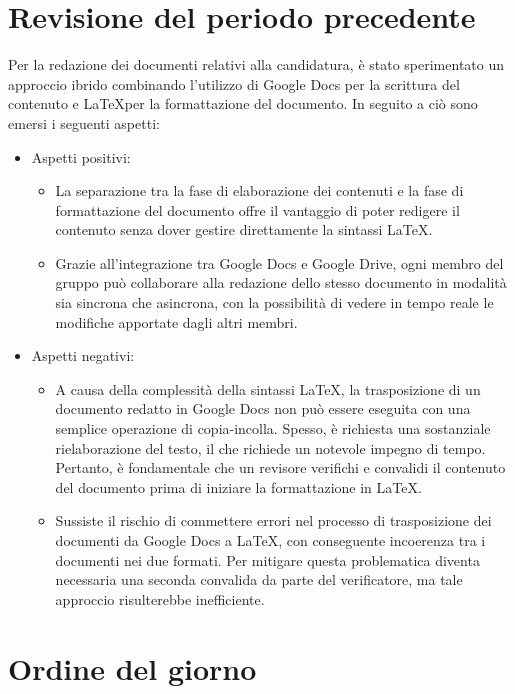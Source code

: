 \documentclass{article}
\begin{document}
\section{Revisione del periodo precedente}
Per la redazione dei documenti relativi alla candidatura, è stato sperimentato un approccio ibrido combinando l'utilizzo di Google Docs per la scrittura del contenuto e \LaTeX per la formattazione del documento. In seguito a ciò sono emersi i seguenti aspetti:
\begin{itemize}
    \item Aspetti positivi:
        \begin{itemize}
            \item La separazione tra la fase di elaborazione dei contenuti e la fase di formattazione del documento offre il vantaggio di poter redigere il contenuto senza dover gestire direttamente la sintassi \LaTeX.
            \item Grazie all’integrazione tra Google Docs e Google Drive, ogni membro del gruppo può collaborare alla redazione dello stesso documento in modalità sia sincrona che asincrona, con la possibilità di vedere in tempo reale le modifiche apportate dagli altri membri.
        \end{itemize}
    \item Aspetti negativi:
        \begin{itemize}
            \item A causa della complessità della sintassi \LaTeX, la trasposizione di un documento redatto in Google Docs non può essere eseguita con una semplice operazione di copia-incolla. Spesso, è richiesta una sostanziale rielaborazione del testo, il che richiede un notevole impegno di tempo. Pertanto, è fondamentale che un revisore verifichi e convalidi il contenuto del documento prima di iniziare la formattazione in \LaTeX.
            \item Sussiste il rischio di commettere errori nel processo di trasposizione dei documenti da Google Docs a \LaTeX, con conseguente incoerenza tra i documenti nei due formati. Per mitigare questa problematica diventa necessaria una seconda convalida da parte del verificatore, ma tale approccio risulterebbe inefficiente.
        \end{itemize}
\end{itemize}

\section{Ordine del giorno}
\end{document}
